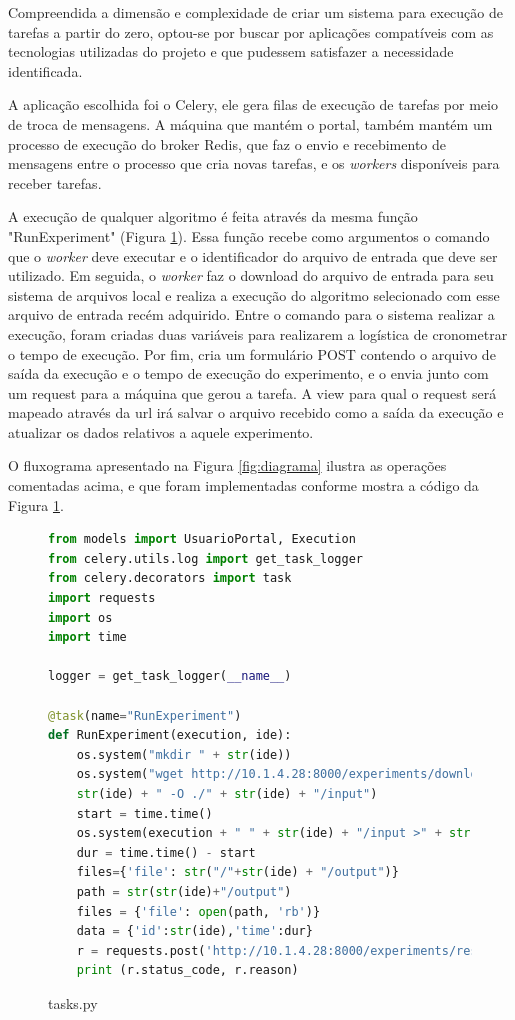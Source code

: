 \documentclass[tg]{mdtufsm}
\begin{document}
Compreendida a dimensão e complexidade de criar um sistema para execução de tarefas a partir do zero, optou-se por buscar por aplicações compatíveis com as tecnologias utilizadas do projeto e que pudessem satisfazer a necessidade identificada.

A aplicação escolhida foi o Celery, ele gera filas de execução de tarefas por meio de troca de mensagens. A máquina que mantém o portal, também mantém um processo de execução do broker Redis, que faz o envio e recebimento de mensagens entre o processo que cria novas tarefas, e os \emph{workers} disponíveis para receber tarefas.

A execução de qualquer algoritmo é feita através da mesma função "RunExperiment" (Figura \ref{fig:run}). Essa função recebe como argumentos o comando que o \emph{worker} deve executar e o identificador do arquivo de entrada que deve ser utilizado. Em seguida, o \emph{worker} faz o download do arquivo de entrada para seu sistema de arquivos local e realiza a execução do algoritmo selecionado com esse arquivo de entrada recém adquirido. Entre o comando para o sistema realizar a execução, foram criadas duas variáveis para realizarem a logística de cronometrar o tempo de execução. Por fim, cria um formulário POST contendo o arquivo de saída da execução e o tempo de execução do experimento, e o envia junto com um request para a máquina que gerou a tarefa. A view para qual o request será mapeado através da url irá salvar o arquivo recebido como a saída da execução e atualizar os dados relativos a aquele experimento.

O fluxograma apresentado na Figura \ref{fig:diagrama} ilustra as operações comentadas acima, e que foram implementadas conforme mostra a código da Figura \ref{fig:run}.

\begin{figure}
	\centering
	\begin{minipage}[c]{1\textwidth}
		\begin{lstlisting}[language=Python, frame=single]
from models import UsuarioPortal, Execution
from celery.utils.log import get_task_logger
from celery.decorators import task
import requests
import os
import time

logger = get_task_logger(__name__)

@task(name="RunExperiment")
def RunExperiment(execution, ide):
	os.system("mkdir " + str(ide))
	os.system("wget http://10.1.4.28:8000/experiments/downloadInputFile?id=" +
	str(ide) + " -O ./" + str(ide) + "/input")
	start = time.time()
	os.system(execution + " " + str(ide) + "/input >" + str(ide) + "/output")
	dur = time.time() - start
	files={'file': str("/"+str(ide) + "/output")}
	path = str(str(ide)+"/output")
	files = {'file': open(path, 'rb')}
	data = {'id':str(ide),'time':dur}
	r = requests.post('http://10.1.4.28:8000/experiments/result', files=files,data=data)
	print (r.status_code, r.reason)
		\end{lstlisting}
		\caption{
			tasks.py
		}
		\label{fig:run}
	\end{minipage}
\end{figure}
\end{document}
